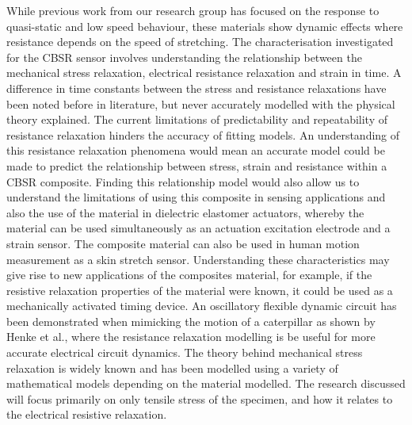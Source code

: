 While previous work from our research group \cite{Giffney2017,Devaraj2018} has focused on the response to quasi-static and low speed behaviour, these materials show dynamic effects where resistance depends on the speed of stretching. The characterisation investigated for the CBSR sensor involves understanding the relationship between the mechanical stress relaxation, electrical resistance relaxation and strain in time. A difference in time constants between the stress and resistance relaxations have been noted before in literature\cite{Kost1994,Wang2013,Maddipatla2017,Wang2004}, but never accurately modelled with the physical theory explained. The current limitations of predictability and repeatability of resistance relaxation hinders the accuracy of fitting models. An understanding of this resistance relaxation phenomena would mean an accurate model could be made to predict the relationship between stress, strain and resistance within a CBSR composite. Finding this relationship model would also allow us to understand the limitations of using this composite in sensing applications and also the use of the material in dielectric elastomer actuators, whereby the material can be used simultaneously as an actuation excitation electrode and a strain sensor. The composite material can also be used in human motion measurement as a skin stretch sensor. Understanding these characteristics may give rise to new applications of the composites material, for example, if the resistive relaxation properties of the material were known, it could be used as a mechanically activated timing device. An oscillatory flexible dynamic circuit has been demonstrated when mimicking the motion of a caterpillar as shown by Henke et al.\cite{Henke2018}, where the resistance relaxation modelling is be useful for more accurate electrical circuit dynamics. The theory behind mechanical stress relaxation is widely known and has been modelled using a variety of mathematical models \cite{Fung1993} depending on the material modelled. The research discussed will focus primarily on only tensile stress of the specimen, and how it relates to the electrical resistive relaxation.


